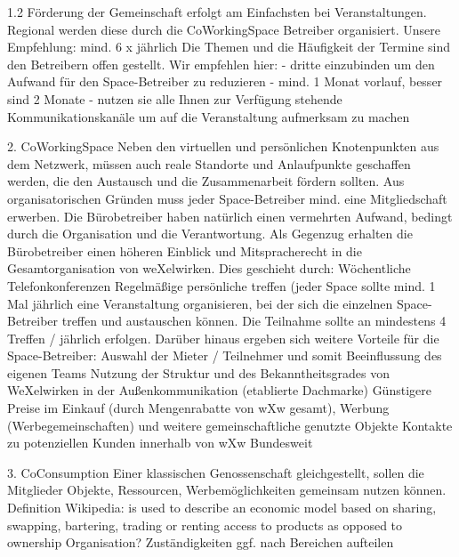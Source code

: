 1.2 Förderung der Gemeinschaft
erfolgt am Einfachsten bei Veranstaltungen. 
Regional werden diese durch die CoWorkingSpace Betreiber organisiert. Unsere Empfehlung: mind. 6 x jährlich 
Die Themen und die Häufigkeit der Termine sind den Betreibern offen gestellt. Wir empfehlen hier:
- dritte einzubinden um den Aufwand für den Space-Betreiber zu reduzieren
- mind. 1 Monat vorlauf, besser sind 2 Monate
- nutzen sie alle Ihnen zur Verfügung stehende Kommunikationskanäle um auf die Veranstaltung aufmerksam zu machen


2. CoWorkingSpace
Neben den virtuellen und persönlichen Knotenpunkten aus dem Netzwerk, müssen auch reale Standorte und Anlaufpunkte geschaffen werden, die den Austausch und die Zusammenarbeit fördern sollten.
Aus organisatorischen Gründen muss jeder Space-Betreiber mind. eine Mitgliedschaft erwerben.
Die Bürobetreiber haben natürlich einen vermehrten Aufwand, bedingt durch die Organisation und die Verantwortung. Als Gegenzug erhalten die Bürobetreiber einen höheren Einblick und Mitspracherecht in die Gesamtorganisation von weXelwirken.
Dies geschieht durch:
Wöchentliche Telefonkonferenzen
Regelmäßige persönliche treffen (jeder Space sollte mind. 1 Mal jährlich eine Veranstaltung organisieren, bei der sich die einzelnen Space-Betreiber treffen und austauschen können. Die Teilnahme sollte an mindestens 4 Treffen / jährlich erfolgen.
Darüber hinaus ergeben sich weitere Vorteile für die Space-Betreiber: 
Auswahl der Mieter / Teilnehmer und somit Beeinflussung des eigenen Teams
Nutzung der Struktur und des Bekanntheitsgrades von WeXelwirken in der Außenkommunikation (etablierte Dachmarke)
Günstigere Preise im Einkauf (durch Mengenrabatte von wXw gesamt), Werbung (Werbegemeinschaften) und weitere gemeinschaftliche genutzte Objekte
Kontakte zu potenziellen Kunden innerhalb von wXw Bundesweit



3. CoConsumption
Einer klassischen Genossenschaft gleichgestellt, sollen die Mitglieder Objekte, Ressourcen, Werbemöglichkeiten gemeinsam nutzen können.
Definition Wikipedia:
is used to describe an economic model based on sharing, swapping, bartering, trading or renting access to products as opposed to ownership
Organisation?
Zuständigkeiten ggf. nach Bereichen aufteilen

